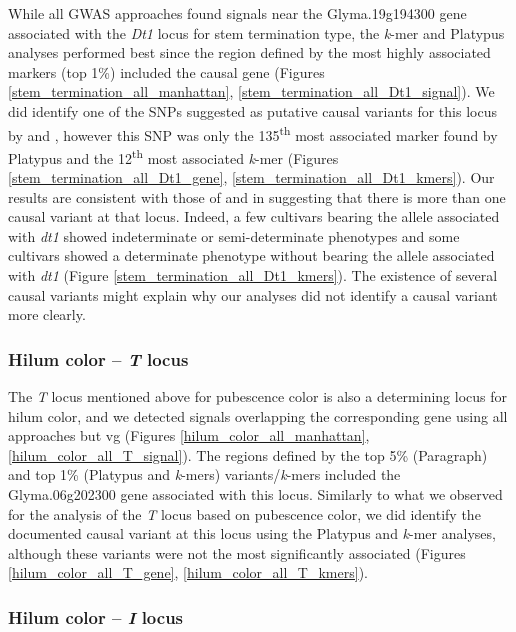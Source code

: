 While all GWAS approaches found signals near the Glyma.19g194300 gene
associated with the \textit{Dt1} locus for stem termination type, the
\textit{k}-mer and Platypus analyses performed best since the region defined by the most highly associated markers
(top 1\%) included the causal gene (Figures
\ref{stem_termination_all_manhattan}, \ref{stem_termination_all_Dt1_signal}).
We did identify one of the SNPs suggested as putative causal variants for this
locus by \cite{tian2010} and \cite{liu2010}, however this SNP was only the
135\textsuperscript{th} most associated marker found by Platypus and the
12\textsuperscript{th} most associated \emph{k}-mer (Figures
\ref{stem_termination_all_Dt1_gene}, \ref{stem_termination_all_Dt1_kmers}).
Our results are consistent with those of \cite{liu2010} and \cite{tian2010} in
suggesting that there is more than one causal variant at that locus. Indeed, a
few cultivars bearing the allele associated with \emph{dt1} showed
indeterminate or semi-determinate phenotypes and some cultivars showed a
determinate phenotype without bearing the allele associated with \emph{dt1}
(Figure \ref{stem_termination_all_Dt1_kmers}). The existence of several causal
variants might explain why our analyses did not identify a causal variant more
clearly.

\subsubsection{Hilum color -- \textit{T} locus}
\label{sv-gwas-main-results-hilum-color-t}

The \textit{T} locus mentioned above for pubescence color is also a determining
locus for hilum color, and we detected signals overlapping the corresponding gene
using all approaches but vg (Figures \ref{hilum_color_all_manhattan},
\ref{hilum_color_all_T_signal}). The regions defined by the top 5\% (Paragraph)
and top 1\% (Platypus and \textit{k}-mers) variants/\textit{k}-mers included
the Glyma.06g202300 gene associated with this locus. Similarly to what we
observed for the analysis of the \textit{T} locus based on pubescence color, we
did identify the documented causal variant at this locus using the Platypus and
\textit{k}-mer analyses, although these variants were not the most
significantly associated (Figures \ref{hilum_color_all_T_gene},
\ref{hilum_color_all_T_kmers}).

\subsubsection{Hilum color -- \textit{I} locus}
\label{sv-gwas-main-results-hilum-color-i}

